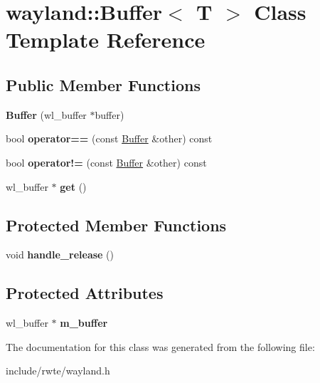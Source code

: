 \hypertarget{classwayland_1_1Buffer}{}\section{wayland\+::Buffer$<$ T $>$ Class Template Reference}
\label{classwayland_1_1Buffer}
\subsection*{Public Member Functions}
\begin{DoxyCompactItemize}
\item 
\mbox{\label{classwayland_1_1Buffer_a1d7f6906aa4c0d76d6a7dafc1457ef33}} 
{\bfseries Buffer} (wl\+\_\+buffer $\ast$buffer)
\item 
\mbox{\label{classwayland_1_1Buffer_a836a6fe757d085519c139f4b96c59542}} 
bool {\bfseries operator==} (const \mbox{\hyperlink{classwayland_1_1Buffer}{Buffer}} \&other) const
\item 
\mbox{\label{classwayland_1_1Buffer_a54229e3db4f4d56448bdc791e3ea06de}} 
bool {\bfseries operator!=} (const \mbox{\hyperlink{classwayland_1_1Buffer}{Buffer}} \&other) const
\item 
\mbox{\label{classwayland_1_1Buffer_ae8ae092a406507da273eddcbd2ba294f}} 
wl\+\_\+buffer $\ast$ {\bfseries get} ()
\end{DoxyCompactItemize}
\subsection*{Protected Member Functions}
\begin{DoxyCompactItemize}
\item 
\mbox{\label{classwayland_1_1Buffer_ad1929c137651160d79a2f9d1a7d6f5a1}} 
void {\bfseries handle\+\_\+release} ()
\end{DoxyCompactItemize}
\subsection*{Protected Attributes}
\begin{DoxyCompactItemize}
\item 
\mbox{\label{classwayland_1_1Buffer_a19928f0c9ac95229ad5661b44f68b2c7}} 
wl\+\_\+buffer $\ast$ {\bfseries m\+\_\+buffer}
\end{DoxyCompactItemize}


The documentation for this class was generated from the following file\+:\begin{DoxyCompactItemize}
\item 
include/rwte/wayland.\+h\end{DoxyCompactItemize}
